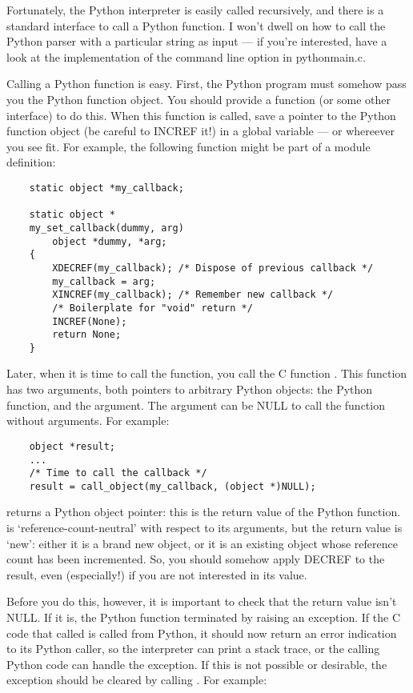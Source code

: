 Fortunately, the Python interpreter is easily called recursively, and
there is a standard interface to call a Python function.  I won't
dwell on how to call the Python parser with a particular string as
input --- if you're interested, have a look at the implementation of
the  command line option in pythonmain.c.

Calling a Python function is easy.  First, the Python program must
somehow pass you the Python function object.  You should provide a
function (or some other interface) to do this.  When this function is
called, save a pointer to the Python function object (be careful to
INCREF it!) in a global variable --- or whereever you see fit.
For example, the following function might be part of a module
definition:

\begin{verbatim}
    static object *my_callback;

    static object *
    my_set_callback(dummy, arg)
        object *dummy, *arg;
    {
        XDECREF(my_callback); /* Dispose of previous callback */
        my_callback = arg;
        XINCREF(my_callback); /* Remember new callback */
        /* Boilerplate for "void" return */
        INCREF(None);
        return None;
    }
\end{verbatim}

Later, when it is time to call the function, you call the C function
.  This function has two arguments, both pointers
to arbitrary Python objects: the Python function, and the argument.
The argument can be NULL to call the function without arguments.  For
example:

\begin{verbatim}
    object *result;
    ...
    /* Time to call the callback */
    result = call_object(my_callback, (object *)NULL);
\end{verbatim}

 returns a Python object pointer: this is
the return value of the Python function.   is
`reference-count-neutral' with respect to its arguments, but the
return value is `new': either it is a brand new object, or it is an
existing object whose reference count has been incremented.  So, you
should somehow apply DECREF to the result, even (especially!) if you
are not interested in its value.

Before you do this, however, it is important to check that the return
value isn't NULL.  If it is, the Python function terminated by raising
an exception.  If the C code that called  is
called from Python, it should now return an error indication to its
Python caller, so the interpreter can print a stack trace, or the
calling Python code can handle the exception.  If this is not possible
or desirable, the exception should be cleared by calling
.  For example:

